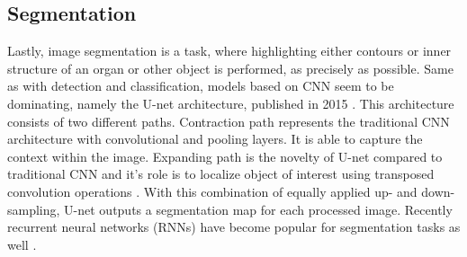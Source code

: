 \subsection{Segmentation}
Lastly, image segmentation is a task, where highlighting either contours or inner structure of an organ or other object is performed, as precisely as possible. Same as with detection and classification, models based on CNN seem to be dominating, namely the U-net architecture, published in 2015 \cite{kim2019deep}. This architecture consists of two different paths. Contraction path represents the traditional CNN architecture with convolutional and pooling layers. It is able to capture the context within the image. Expanding path is the novelty of U-net compared to traditional CNN and it's role is to localize object of interest using transposed convolution operations \cite{surveyOnImageing}. With this combination of equally applied up- and down-sampling, U-net outputs a segmentation map for each processed image. Recently recurrent neural networks (RNNs) have become popular for segmentation tasks as well \cite{surveyOnImageing}. 